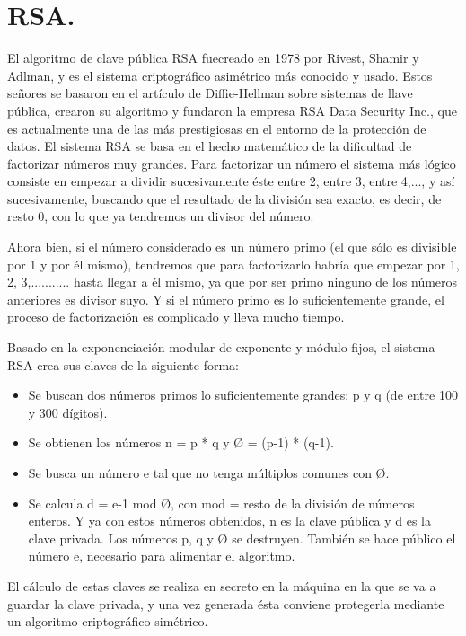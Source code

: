 
\section{RSA. }

El algoritmo de clave pública RSA fuecreado en 1978 por Rivest, Shamir y Adlman, y es el sistema criptográfico asimétrico más conocido y usado. Estos señores se basaron en el artículo de Diffie-Hellman sobre sistemas de llave pública, crearon su algoritmo y fundaron la empresa RSA Data Security Inc., que es actualmente una de las más prestigiosas en el entorno de la protección de datos.
El sistema RSA se basa en el hecho matemático de la dificultad de factorizar números muy grandes. Para factorizar un número el sistema más lógico consiste en empezar a dividir sucesivamente éste entre 2, entre 3, entre 4,..., y así sucesivamente, buscando que el resultado de la división sea exacto, es decir, de resto 0, con lo que ya tendremos un divisor del número.

Ahora bien, si el número considerado es un número primo (el que sólo es divisible por 1 y por él mismo), tendremos que para factorizarlo habría que empezar por 1, 2, 3,........... hasta llegar a él mismo, ya que por ser primo ninguno de los números anteriores es divisor suyo. Y si el número primo es lo suficientemente grande, el proceso de factorización es complicado y lleva mucho tiempo.

Basado en la exponenciación modular de exponente y módulo fijos, el sistema RSA crea sus claves de la siguiente forma:
\begin{itemize}

	\item Se buscan dos números primos lo suficientemente grandes: p y q (de entre 100 y 300 dígitos).
	\item Se obtienen los números n = p * q y Ø = (p-1) * (q-1).
	\item Se busca un número e tal que no tenga múltiplos comunes con Ø.
	\item Se calcula d = e-1 mod Ø, con mod = resto de la división de números enteros. Y ya con estos números obtenidos, n es la clave pública y d es la clave privada. Los números p, q y Ø se destruyen. También se hace público el número e, necesario para alimentar el algoritmo.
\end{itemize} 

El cálculo de estas claves se realiza en secreto en la máquina en la que se va a guardar la clave privada, y una vez generada ésta conviene protegerla mediante un algoritmo criptográfico simétrico.

